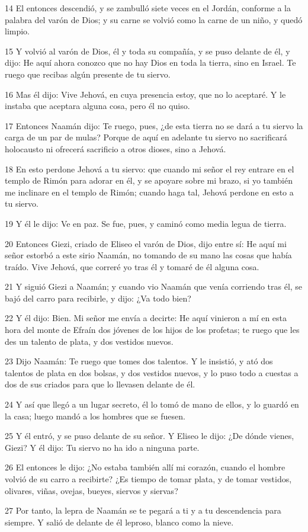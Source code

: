 \par 14 El entonces descendió, y se zambulló siete veces en el Jordán, conforme a la palabra del varón de Dios; y su carne se volvió como la carne de un niño, y quedó limpio.
\par 15 Y volvió al varón de Dios, él y toda su compañía, y se puso delante de él, y dijo: He aquí ahora conozco que no hay Dios en toda la tierra, sino en Israel. Te ruego que recibas algún presente de tu siervo. 
\par 16 Mas él dijo: Vive Jehová, en cuya presencia estoy, que no lo aceptaré. Y le instaba que aceptara alguna cosa, pero él no quiso.
\par 17 Entonces Naamán dijo: Te ruego, pues, ¿de esta tierra no se dará a tu siervo la carga de un par de mulas? Porque de aquí en adelante tu siervo no sacrificará holocausto ni ofrecerá sacrificio a otros dioses, sino a Jehová.
\par 18 En esto perdone Jehová a tu siervo: que cuando mi señor el rey entrare en el templo de Rimón para adorar en él, y se apoyare sobre mi brazo, si yo también me inclinare en el templo de Rimón; cuando haga tal, Jehová perdone en esto a tu siervo.
\par 19 Y él le dijo: Ve en paz. Se fue, pues, y caminó como media legua de tierra.
\par 20 Entonces Giezi, criado de Eliseo el varón de Dios, dijo entre sí: He aquí mi señor estorbó a este sirio Naamán, no tomando de su mano las cosas que había traído. Vive Jehová, que correré yo tras él y tomaré de él alguna cosa.
\par 21 Y siguió Giezi a Naamán; y cuando vio Naamán que venía corriendo tras él, se bajó del carro para recibirle, y dijo: ¿Va todo bien?
\par 22 Y él dijo: Bien. Mi señor me envía a decirte: He aquí vinieron a mí en esta hora del monte de Efraín dos jóvenes de los hijos de los profetas; te ruego que les des un talento de plata,  y dos vestidos nuevos.
\par 23 Dijo Naamán: Te ruego que tomes dos talentos.  Y le insistió, y ató dos talentos de plata en dos bolsas, y dos vestidos nuevos, y lo puso todo a cuestas a dos de sus criados para que lo llevasen delante de él.
\par 24 Y así que llegó a un lugar secreto, él lo tomó de mano de ellos, y lo guardó en la casa; luego mandó a los hombres que se fuesen.
\par 25 Y él entró, y se puso delante de su señor. Y Eliseo le dijo: ¿De dónde vienes, Giezi? Y él dijo: Tu siervo no ha ido a ninguna parte.
\par 26 El entonces le dijo: ¿No estaba también allí mi corazón, cuando el hombre volvió de su carro a recibirte? ¿Es tiempo de tomar plata, y de tomar vestidos, olivares, viñas, ovejas, bueyes, siervos y siervas?
\par 27 Por tanto, la lepra de Naamán se te pegará a ti y a tu descendencia para siempre. Y salió de delante de él leproso, blanco como la nieve.

